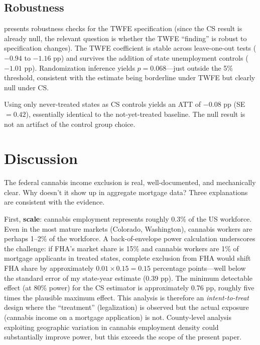 \documentclass[12pt]{article}
\begin{document}


\subsection{Robustness}

 presents robustness checks for the TWFE specification (since the CS result is already null, the relevant question is whether the TWFE ``finding'' is robust to specification changes). The TWFE coefficient is stable across leave-one-out tests ($-0.94$ to $-1.16$ pp) and survives the addition of state unemployment controls ($-1.01$ pp). Randomization inference yields $p = 0.068$---just outside the 5\% threshold, consistent with the estimate being borderline under TWFE but clearly null under CS.

Using only never-treated states as CS controls yields an ATT of $-0.08$ pp (SE $= 0.42$), essentially identical to the not-yet-treated baseline. The null result is not an artifact of the control group choice.



\section{Discussion}
\label{sec:discussion}

The federal cannabis income exclusion is real, well-documented, and mechanically clear. Why doesn't it show up in aggregate mortgage data? Three explanations are consistent with the evidence.

First, \textbf{scale}: cannabis employment represents roughly 0.3\% of the US workforce. Even in the most mature markets (Colorado, Washington), cannabis workers are perhaps 1--2\% of the workforce. A back-of-envelope power calculation underscores the challenge: if FHA's market share is 15\% and cannabis workers are 1\% of mortgage applicants in treated states, complete exclusion from FHA would shift FHA share by approximately $0.01 \times 0.15 = 0.15$ percentage points---well below the standard error of my state-year estimate (0.39 pp). The minimum detectable effect (at 80\% power) for the CS estimator is approximately 0.76 pp, roughly five times the plausible maximum effect. This analysis is therefore an \textit{intent-to-treat} design where the ``treatment'' (legalization) is observed but the actual exposure (cannabis income on a mortgage application) is not. County-level analysis exploiting geographic variation in cannabis employment density could substantially improve power, but this exceeds the scope of the present paper.
\end{document}
